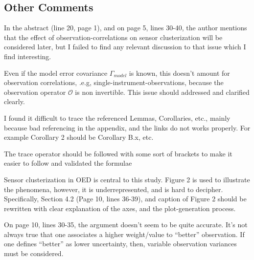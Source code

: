 \documentclass{amsart}
\begin{document}
\subsection{Other Comments}

In the abstract (line 20, page 1), and on page 5, lines 30-40, the
author mentions that the effect of observation-correlations on sensor
clusterization will be considered later, but I failed to find any
relevant discussion to that issue which I find interesting.

Even if the model error covariance $\Gamma_{model}$ is known, this
doesn't amount for observation correlations, .e.g,
single-instrument-observations, because the observation operator
$\mathcal{O}$ is non invertible. This issue should addressed and
clarified clearly.  


I found it difficult to trace the referenced Lemmas, Corollaries,
etc., mainly because bad referencing in the appendix, and the links do
not works properly.  For example Corollary 2 should be Corollary B.x,
etc.  

The trace operator should be followed with some sort of brackets to
make it easier to follow and validated the formulae

Sensor clusterization in OED is central to this study. Figure 2 is
used to illustrate the phenomena, however, it is underrepresented, and
is hard to decipher. Specifically, Section 4.2 (Page 10, lines 36-39),
and caption of Figure 2 should be rewritten with clear explanation of
the axes, and the plot-generation process.  

On page 10, lines 30-35, the argument doesn't seem to be quite
accurate. It's not always true that one associates a higher
weight/value to ``better'' observation. If one defines ``better'' as
lower uncertainty, then, variable observation variances must be
considered. 
\end{document}
